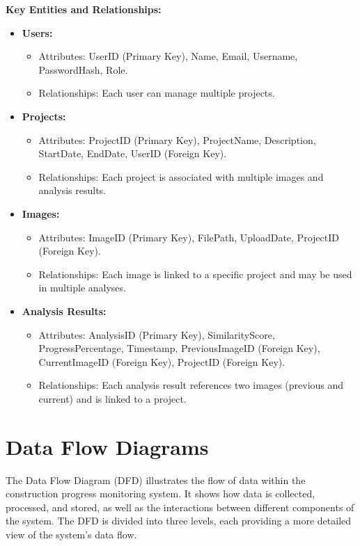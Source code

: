 \documentclass[12pt,a4paper]{report}
\begin{document}
\textbf{Key Entities and Relationships:}
\begin{itemize}
    \item \textbf{Users:}
    \begin{itemize}
        \item Attributes: UserID (Primary Key), Name, Email, Username, PasswordHash, Role.
        \item Relationships: Each user can manage multiple projects.
    \end{itemize}
    \item \textbf{Projects:}
    \begin{itemize}
        \item Attributes: ProjectID (Primary Key), ProjectName, Description, StartDate, EndDate, UserID (Foreign Key).
        \item Relationships: Each project is associated with multiple images and analysis results.
    \end{itemize}
    \item \textbf{Images:}
    \begin{itemize}
        \item Attributes: ImageID (Primary Key), FilePath, UploadDate, ProjectID (Foreign Key).
        \item Relationships: Each image is linked to a specific project and may be used in multiple analyses.
    \end{itemize}
    \item \textbf{Analysis Results:}
    \begin{itemize}
        \item Attributes: AnalysisID (Primary Key), SimilarityScore, ProgressPercentage, Timestamp, PreviousImageID (Foreign Key), CurrentImageID (Foreign Key), ProjectID (Foreign Key).
        \item Relationships: Each analysis result references two images (previous and current) and is linked to a project.
    \end{itemize}
\end{itemize}

\section{Data Flow Diagrams}
The Data Flow Diagram (DFD) illustrates the flow of data within the construction progress monitoring system. It shows how data is collected, processed, and stored, as well as the interactions between different components of the system. The DFD is divided into three levels, each providing a more detailed view of the system's data flow.
\end{document}
